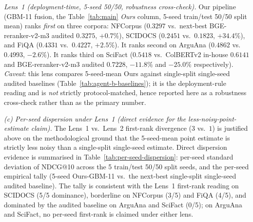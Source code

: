 \documentclass[review,1p]{elsarticle}
\begin{document}
\textit{Lens~1 (deployment-time, 5-seed 50/50, robustness cross-check).} Our pipeline (GBM-11 fusion, the Table~\ref{tab:main} \textit{Ours} column, 5-seed train/test 50/50 split mean) ranks \emph{first} on three corpora: NFCorpus ($0.3297$ vs.\ next-best BGE-reranker-v2-m3 audited $0.3275$, $+0.7\%$), SCIDOCS ($0.2451$ vs.\ $0.1823$, $+34.4\%$), and FiQA ($0.4331$ vs.\ $0.4227$, $+2.5\%$). It ranks second on ArguAna ($0.4862$ vs.\ $0.4993$, $-2.6\%$). It ranks third on SciFact ($0.5418$ vs.\ ColBERTv2 in-house $0.6141$ and BGE-reranker-v2-m3 audited $0.7228$, $-11.8\%$ and $-25.0\%$ respectively). \emph{Caveat}: this lens compares 5-seed-mean Ours against single-split single-seed audited baselines (Table~\ref{tab:agent-b-baselines}); it is the deployment-rule reading and is \emph{not} strictly protocol-matched, hence reported here as a robustness cross-check rather than as the primary number.

\textit{(c) Per-seed dispersion under Lens~1 (direct evidence for the less-noisy-point-estimate claim).} The Lens~1 vs.\ Lens~2 first-rank divergence ($3$ vs.\ $1$) is justified above on the methodological ground that the 5-seed-mean point estimate is strictly less noisy than a single-split single-seed estimate. Direct dispersion evidence is summarised in Table~\ref{tab:per-seed-dispersion}: per-seed standard deviation of NDCG@10 across the 5 train/test 50/50 split seeds, and the per-seed empirical tally (5-seed Ours-GBM-11 vs.\ the next-best single-split single-seed audited baseline). The tally is consistent with the Lens~1 first-rank reading on SCIDOCS (5/5 dominance), borderline on NFCorpus (3/5) and FiQA (4/5), and dominated by the audited baseline on ArguAna and SciFact (0/5); on ArguAna and SciFact, no per-seed first-rank is claimed under either lens.
\end{document}
